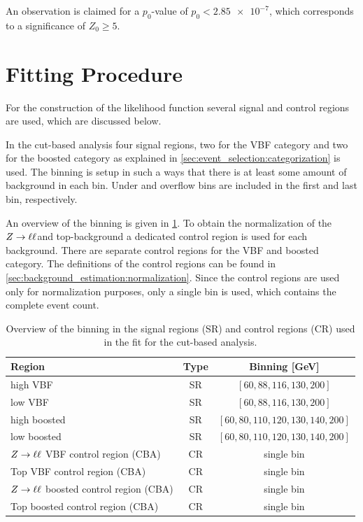 An observation is claimed for a $p_0$-value of $p_0 < \num{2.85e-7}$, which corresponds to a significance of $Z_0 \geq 5$.

\section{Fitting Procedure}\label{sec:fit:procedure}

For the construction of the likelihood function several signal and control regions are used, which are discussed below.

In the cut-based analysis four signal regions, two for the VBF category and two for the boosted category as explained in \cref{sec:event_selection:categorization} is used.
The binning is setup in such a ways that there is at least some amount of background in each bin.
Under and overflow bins are included in the first and last bin, respectively.

An overview of the binning is given in \cref{tab:fit:regions:cba}.
To obtain the normalization of the $Z \to \ell \ell$and top-background a dedicated control region is used for each background.
There are separate control regions for the VBF and boosted category.
The definitions of the control regions can be found in \cref{sec:background_estimation:normalization}.
Since the control regions are used only for normalization purposes, only a single bin is used, which contains the complete event count.

\begin{table}[htpb]
    \centering
    \caption{Overview of the binning in the signal regions (SR) and control regions (CR) used in the fit for the cut-based analysis.}\label{tab:fit:regions:cba}
    \begin{tabular}{lcc}
        \toprule
        Region                              & Type  & Binning [GeV] \\ \midrule
        high VBF                            & SR    & $\left[60, 88, 116, 130, 200\right]$ \\
        low VBF                             & SR    & $\left[60, 88, 116, 130, 200\right]$ \\
        high boosted                        & SR    & $\left[60, 80, 110, 120, 130, 140, 200\right]$ \\
        low boosted                         & SR    & $\left[60, 80, 110, 120, 130, 140, 200\right]$ \\
        $Z \to \ell \ell$ VBF control region (CBA)     & CR    & single bin\\
        Top VBF control region (CBA)        & CR    & single bin\\
        $Z \to \ell \ell$ boosted control region (CBA) & CR    & single bin\\
        Top boosted control region (CBA)    & CR    & single bin\\
    \end{tabular}
\end{table}

